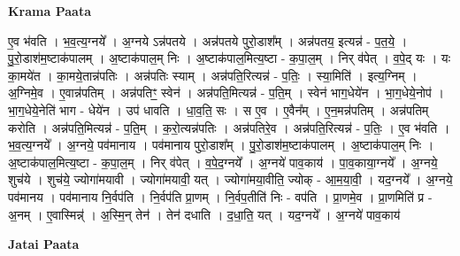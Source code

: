 \documentclass[17pt]{extarticle}
\begin{document}
\textbf{Krama Paata} \newline

ए॒व भ॑वति । भ॒व॒त्य॒ग्नये᳚ । अ॒ग्नये ऽन्न॑पतये । अन्न॑पतये पुरो॒डाश᳚म् । अन्न॑पतय॒ इत्यन्न॑ - प॒त॒ये॒ । पु॒रो॒डाश॑म॒ष्टाक॑पालम् । अ॒ष्टाक॑पाल॒म् निः । अ॒ष्टाक॑पाल॒मित्य॒ष्टा - क॒पा॒ल॒म् । निर् व॑पेत् । व॒पे॒द् यः । यः का॒मये॑त । का॒मये॒तान्न॑पतिः । अन्न॑पतिः स्याम् । अन्न॑पति॒रित्यन्न॑ - प॒तिः॒ । स्या॒मिति॑ । इत्य॒ग्निम् । अ॒ग्निमे॒व । ए॒वान्न॑पतिम् । अन्न॑पतिꣳ॒॒ स्वेन॑ । अन्न॑पति॒मित्यन्न॑ - प॒ति॒म् । स्वेन॑ भाग॒धेये॑न । भा॒ग॒धेये॒नोप॑ । भा॒ग॒धेये॒नेति॑ भाग - धेये॑न । उप॑ धावति । धा॒व॒ति॒ सः । स ए॒व । ए॒वैन᳚म् । ए॒न॒मन्न॑पतिम् । अन्न॑पतिम् करोति । अन्न॑पति॒मित्यन्न॑ - प॒ति॒॒म् । क॒रो॒त्यन्न॑पतिः । अन्न॑पतिरे॒व । अन्न॑पति॒रित्यन्न॑ - प॒तिः॒ । ए॒व भ॑वति । भ॒व॒त्य॒ग्नये᳚ । अ॒ग्नये॒ पव॑मानाय । पव॑मानाय पुरो॒डाश᳚म् । पु॒रो॒डाश॑म॒ष्टाक॑पालम् । अ॒ष्टाक॑पाल॒म् निः । अ॒ष्टाक॑पाल॒मित्य॒ष्टा - क॒पा॒ल॒म् । निर् व॑पेत् । व॒पे॒द॒ग्नये᳚ । अ॒ग्नये॑ पाव॒काय॑ । पा॒व॒काया॒ग्नये᳚ । अ॒ग्नये॒ शुच॑ये । शुच॑ये॒ ज्योगा॑मयावी । ज्योगा॑मयावी॒ यत् । ज्योगा॑मया॒वीति॒ ज्योक् - आ॒म॒या॒वी॒ । यद॒ग्नये᳚ । अ॒ग्नये॒ पव॑मानय । पव॑मानाय नि॒र्वप॑ति । नि॒र्वप॑ति प्रा॒णम् । नि॒र्वप॒तीति॑ निः - वप॑ति । प्रा॒णमे॒व । प्रा॒णमिति॑ प्र - अ॒नम् । ए॒वास्मिन्न्॑ । अ॒स्मि॒न् तेन॑ । तेन॑ दधाति । द॒धा॒ति॒ यत् । यद॒ग्नये᳚ । अ॒ग्नये॑ पाव॒काय॑ \newline

\textbf{Jatai Paata} \newline
\end{document}
